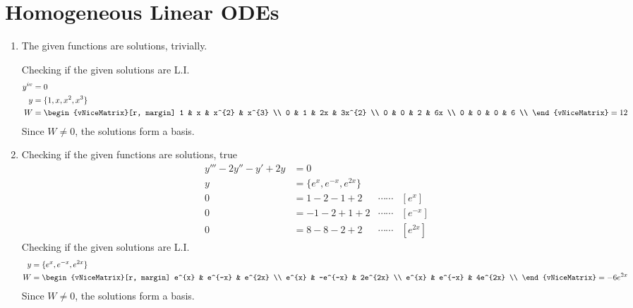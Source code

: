 \section{Homogeneous Linear ODEs}
\begin{enumerate}
      \item The given functions are solutions, trivially. \par
            Checking if the given solutions are L.I.
            \begin{align}
                  y^{iv} & = 0                             \\
                  y      & = \{1, x, x^{2}, x^{3}\}        \\
                  W      & = \begin{vNiceMatrix}[r, margin]
                                   1 & x & x^{2} & x^{3}  \\
                                   0 & 1 & 2x    & 3x^{2} \\
                                   0 & 0 & 2     & 6x     \\
                                   0 & 0 & 0     & 6      \\
                             \end{vNiceMatrix} = 12
            \end{align}
            Since $ W \neq 0 $, the solutions form a basis.

      \item Checking if the given functions are solutions, true
            \begin{align}
                  y''' - 2y'' - y' + 2y & = 0                           \\
                  y                     & = \{e^{x}, e^{-x}, e^{2x}\}   \\
                  0                     & = 1 - 2 - 1 + 2             &
                  \cdots\cdots          & [e^{x}]                       \\
                  0                     & = -1 - 2 + 1 + 2            &
                  \cdots\cdots          & [e^{-x}]                      \\
                  0                     & = 8 - 8 - 2 + 2             &
                  \cdots\cdots          & [e^{2x}]
            \end{align}
            Checking if the given solutions are L.I.
            \begin{align}
                  y & = \{e^{x}, e^{-x}, e^{2x}\}     \\
                  W & = \begin{vNiceMatrix}[r, margin]
                              e^{x} & e^{-x}  & e^{2x}  \\
                              e^{x} & -e^{-x} & 2e^{2x} \\
                              e^{x} & e^{-x}  & 4e^{2x} \\
                        \end{vNiceMatrix} = - 6e^{2x}
            \end{align}
            Since $ W \neq 0 $, the solutions form a basis.


\end{enumerate}
